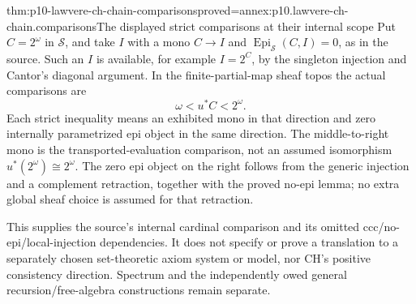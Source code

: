 \begin{hbtheorem}{thm:p10-lawvere-ch-chain-comparisons}{proved=annex:p10.lawvere-ch-chain.comparisons}{The displayed strict comparisons at their internal scope}
Put \(C=2^\omega\) in \(\mathcal S\), and take \(I\) with a mono
\(C\to I\) and \(\operatorname{Epi}_{\mathcal S}(C,I)=0\), as in the
source. Such an \(I\) is available, for example \(I=2^C\), by the
singleton injection and Cantor's diagonal argument.
In the finite-partial-map sheaf topos the actual comparisons are
\[
             \omega<u^*C<2^\omega.
\]
Each strict inequality means an exhibited mono in that direction and
zero internally parametrized epi object in the same direction.
The middle-to-right mono is the transported-evaluation comparison, not
an assumed isomorphism \(u^*(2^\omega)\cong2^\omega\).
The zero epi object on the right follows from the generic injection and a complement
retraction, together with the proved no-epi lemma; no extra global sheaf
choice is assumed for that retraction.

This supplies the source's internal cardinal comparison and its omitted
ccc/no-epi/local-injection dependencies. It does not specify or prove
a translation to a separately chosen set-theoretic axiom system or model,
nor CH's positive consistency direction. Spectrum and the independently
owed general recursion/free-algebra constructions remain separate.
\end{hbtheorem}
